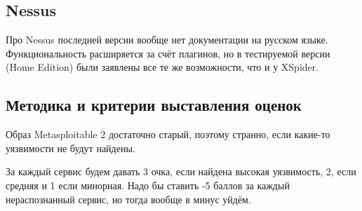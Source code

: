 \subsection{Nessus}

 Про Nessus последней версии вообще нет документации на русском языке. Функциональность расширяется за счёт плагинов, но в тестируемой версии (Home Edition) были заявлены все те же возможности, что и у XSpider.
 
 
 \subsection{Методика и критерии выставления оценок}
 
 Образ Metasploitable 2 достаточно старый, поэтому странно, если какие-то уязвимости не будут найдены.
 
 За каждый сервис будем давать 3 очка, если найдена высокая уязвимость, 2, если средняя и 1 если минорная. Надо бы ставить -5 баллов за каждый нераспознанный сервис, но тогда вообще в минус уйдём.
